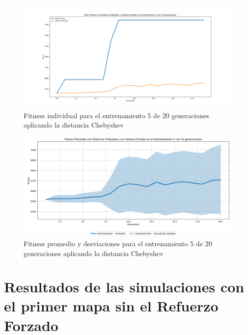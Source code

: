 \documentclass[conference]{IEEEtran}
\begin{document}
\begin{figure}[H]
    \centering
    \includegraphics[width=0.9 \linewidth]{Chebyshev/Fitness_individual_20Gen/Fitness_5_Cheby_20Gen.png}
    \caption{Fitness individual para el entrenamiento 5 de 20 generaciones aplicando la distancia Chebyshev}
    \label{fig:cheb_5_20}
\end{figure}
\begin{figure}[H]
    \centering
    \includegraphics[width=0.9 \linewidth]{Chebyshev/Fitness_individual_20Gen/Fitness_5_Cheby_20Gen_Sombra.png}
    \caption{Fitness promedio y desviaciones para el entrenamiento 5 de 20 generaciones aplicando la distancia Chebyshev}
    \label{fig:cheb_5_20_sombra}
\end{figure}

\section{Resultados de las simulaciones con el primer mapa sin el Refuerzo Forzado}
\end{document}
